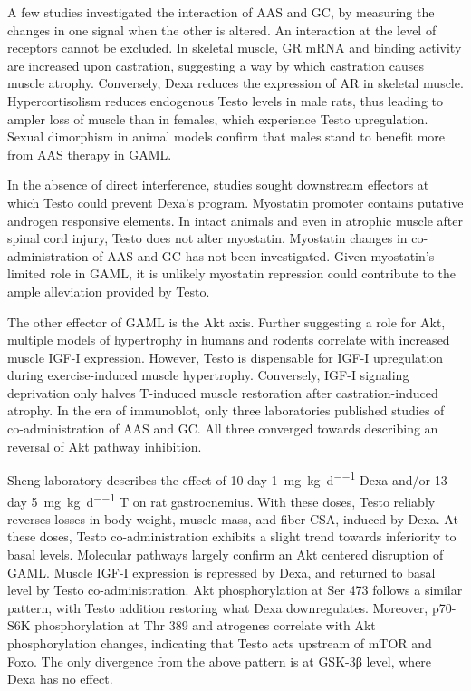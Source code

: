\documentclass[12pt,english]{report}\usepackage[]{graphicx}\usepackage[]{color}
\begin{document}
A few studies investigated the interaction of AAS and GC, by measuring
the changes in one signal when the other is altered. An interaction
at the level of receptors cannot be excluded. In skeletal muscle,
GR mRNA and binding activity are increased upon castration\citep{ye2014transcriptional,dubois1984perineal},
suggesting a way by which castration causes muscle atrophy. Conversely,
Dexa reduces the expression of AR in skeletal muscle\citep{inder2010dexamethasone}.
Hypercortisolism reduces endogenous Testo levels in male rats, thus
leading to ampler loss of muscle than in females, which experience
Testo upregulation\citep{prezant1997gender-specific}. Sexual dimorphism
in animal models confirm that males stand to benefit more from AAS
therapy in GAML.

In the absence of direct interference, studies sought downstream effectors
at which Testo could prevent Dexa's program. Myostatin promoter contains
putative androgen responsive elements\citep{ma2003glucocorticoid-induced}.
In intact animals and even in atrophic muscle after spinal cord injury,
Testo does not alter myostatin\citep{rigamonti2009muscle,wu2012nandrolone}.
Myostatin changes in co-administration of AAS and GC has not been
investigated. Given myostatin's limited role in GAML, it is unlikely
myostatin repression could contribute to the ample alleviation provided
by Testo.

The other effector of GAML is the Akt axis. Further suggesting a role
for Akt, multiple models of hypertrophy in humans and rodents correlate
with increased muscle IGF-I expression\citep{urban1995testosterone,lewis2002role}.
However, Testo is dispensable for IGF-I upregulation during exercise-induced
muscle hypertrophy\citep{kvorning2007suppression}. Conversely, IGF-I
signaling deprivation only halves T-induced muscle restoration after
castration-induced atrophy\citep{serra2013effects}. In the era of
immunoblot, only three laboratories published studies of co-administration
of AAS and GC. All three converged towards describing an reversal
of Akt pathway inhibition.

Sheng laboratory describes the effect of 10-day \SI{1}{\milli\gram\per\kilo\gram\per\day}
Dexa and/or 13-day \SI{5}{\milli\gram\per\kilo\gram\per\day} T\citep{yin2009regulation}
on rat gastrocnemius. With these doses, Testo reliably reverses losses
in body weight, muscle mass, and fiber CSA, induced by Dexa. At these
doses, Testo co-administration exhibits a slight trend towards inferiority
to basal levels. Molecular pathways largely confirm an Akt centered
disruption of GAML. Muscle IGF-I expression is repressed by Dexa,
and returned to basal level by Testo co-administration. Akt phosphorylation
at Ser 473 follows a similar pattern, with Testo addition restoring
what Dexa downregulates. Moreover, p70-S6K phosphorylation at Thr
389 and atrogenes correlate with Akt phosphorylation changes, indicating
that Testo acts upstream of mTOR and Foxo. The only divergence from
the above pattern is at GSK-3β level, where Dexa has no effect.
\end{document}
